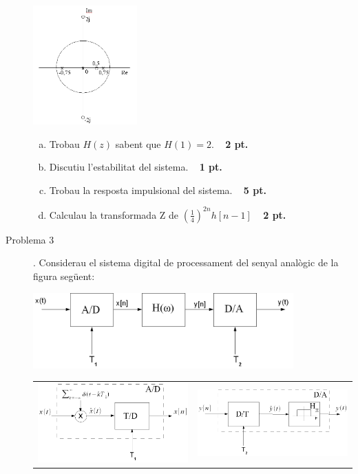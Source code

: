 \documentclass{article}
\begin{document}
\begin{description}
\begin{center}
\includegraphics[width=4cm]{zerospols.png}
\end{center}

\begin{enumerate}[a)]

\item Trobau $H(z)$ sabent que $H(1)=2$.
\ \hfill{\textbf{ 2 pt.}}
\item Discutiu l'estabilitat del sistema.
\ \hfill{\textbf{ 1 pt.}}
\item Trobau la resposta impulsional del sistema.
\ \hfill{\textbf{ 5 pt.}}
\item Calculau la transformada Z de $(\frac{1}{4})^{2n}h[n-1]$
\ \hfill{\textbf{ 2 pt.}}


\end{enumerate}  

\newpage

\item[Problema 3].
Considerau el sistema digital de processament del senyal analògic de la figura següent:


\begin{center}
\includegraphics[width=10cm]{esquemaADDAT1T2.png}
\end{center}

\begin{center}
\begin{tabular}{cc}
\includegraphics[width=6cm]{ADT1.png}
&
\includegraphics[width=6cm]{DAT2.png}
\end{tabular}
\end{center}


\end{description}
\end{document}

